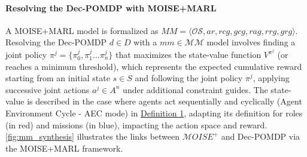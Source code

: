 \documentclass[pdflatex,sn-mathphys-num]{sn-jnl}%
\theoremstyle{thmstyleone}%
\theoremstyle{thmstyletwo}%
\theoremstyle{thmstylethree}%
\begin{document}
\paragraph{\textbf{Resolving the Dec-POMDP with MOISE+MARL}}

A MOISE+MARL model is formalized as $MM = \langle \mathcal{OS}, ar, rcg, gcg, rag, rrg, grg\rangle$.
Resolving the Dec-POMDP $d \in D$ with a $mm \in \mathcal{MM}$ model involves finding a joint policy $\pi^{j} = \{\pi^j_0,\pi^j_1\dots\pi^j_n\}$ that maximizes the state-value function $V^{\pi^{j}}$ (or reaches a minimum threshold), which represents the expected cumulative reward starting from an initial state $s \in S$ and following the joint policy $\pi^{j}$, applying successive joint actions $a^{j} \in A^n$ under additional constraint guides. The state-value is described in the case where agents act sequentially and cyclically (Agent Environment Cycle - AEC mode) in \hyperref[eq:single_value_function]{Definition 1}, adapting its definition for roles (in red) and missions (in blue), impacting the action space and reward. \autoref{fig:mm_synthesis} illustrates the links between $\mathcal{M}OISE^+$ and Dec-POMDP via the MOISE+MARL framework.
\end{document}
